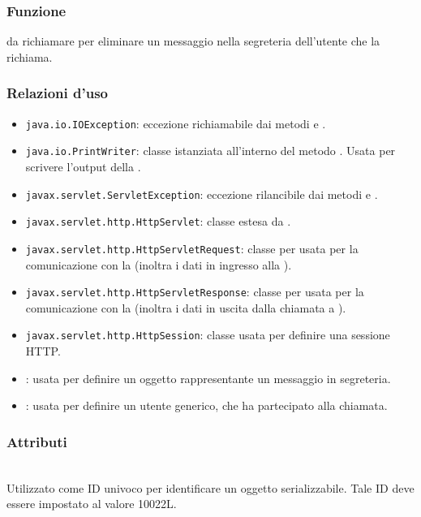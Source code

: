 
\subsubsection*{Funzione}
 da richiamare per eliminare un messaggio nella segreteria dell'utente che la richiama.

\subsubsection*{Relazioni d'uso}
\begin{itemize}
	\item \texttt{java.io.IOException}: eccezione richiamabile dai metodi  e .
	\item \texttt{java.io.PrintWriter}: classe istanziata all'interno del metodo . Usata per scrivere l'output della .
	\item \texttt{javax.servlet.ServletException}: eccezione rilancibile dai metodi  e .
	\item \texttt{javax.servlet.http.HttpServlet}: classe estesa da .
	\item \texttt{javax.servlet.http.HttpServletRequest}:  classe per usata per la comunicazione con la  (inoltra i dati in ingresso alla ).
	\item \texttt{javax.servlet.http.HttpServletResponse}: classe per usata per la comunicazione con la  (inoltra i dati in uscita dalla chiamata a ).
	\item \texttt{javax.servlet.http.HttpSession}: classe usata per definire una sessione HTTP.
	\item {}: usata per definire un oggetto rappresentante un messaggio in segreteria.
	\item {}: usata per definire un utente generico, che ha partecipato alla chiamata.
\end{itemize}

\subsubsection*{Attributi}
\begin{description}
  \item{}\\
  Utilizzato come ID univoco per identificare un oggetto serializzabile. Tale ID deve essere impostato al valore 10022L.
\end{description}


